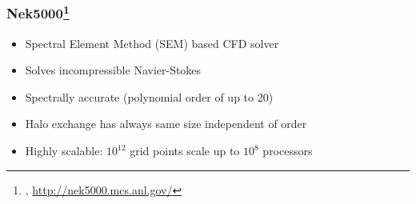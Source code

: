 \begin{frame}
    \frametitle{Nek5000\footnote{\cite{nekmanual}, \url{http://nek5000.mcs.anl.gov/}}}
    \begin{itemize}
      \item Spectral Element Method (SEM) based CFD solver
      \item Solves incompressible Navier-Stokes
      \item Spectrally accurate (polynomial order of up to 20)
      \item Halo exchange has always same size independent of order
      \item Highly scalable: $10^{12}$ grid points scale up to $10^8$ processors
    \end{itemize}
\begin{figure}
  \centering
\end{figure}
\end{frame}



